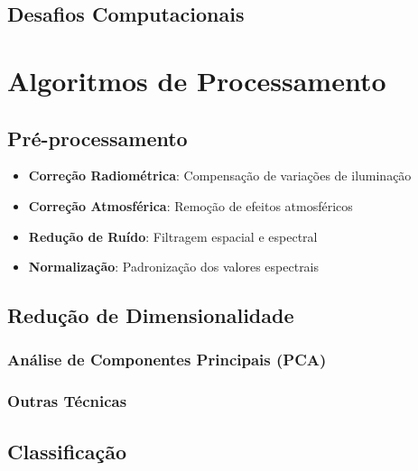 \subsection{Desafios Computacionais}

\section{Algoritmos de Processamento}\label{sec:algoritmos}

\subsection{Pré-processamento}
\begin{itemize}
    \item \textbf{Correção Radiométrica}: Compensação de variações de iluminação
    \item \textbf{Correção Atmosférica}: Remoção de efeitos atmosféricos
    \item \textbf{Redução de Ruído}: Filtragem espacial e espectral
    \item \textbf{Normalização}: Padronização dos valores espectrais
\end{itemize}

\subsection{Redução de Dimensionalidade}
\subsubsection{Análise de Componentes Principais (PCA)}

\subsubsection{Outras Técnicas}

\subsection{Classificação}
